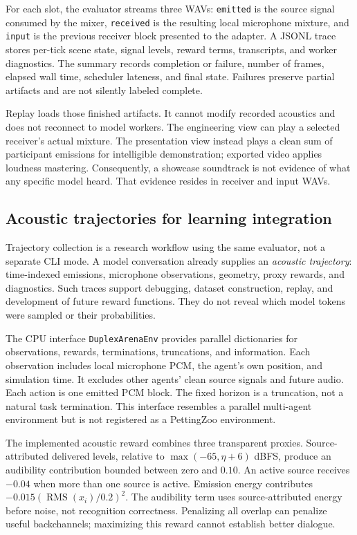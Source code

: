 \documentclass{article}
\newcommand{\code}[1]{\texttt{#1}}
\begin{document}
For each slot, the evaluator streams three WAVs: \code{emitted} is the source signal consumed by the mixer, \code{received} is the resulting local microphone mixture, and \code{input} is the previous receiver block presented to the adapter. A JSONL trace stores per-tick scene state, signal levels, reward terms, transcripts, and worker diagnostics. The summary records completion or failure, number of frames, elapsed wall time, scheduler lateness, and final state. Failures preserve partial artifacts and are not silently labeled complete.

Replay loads those finished artifacts. It cannot modify recorded acoustics and does not reconnect to model workers. The engineering view can play a selected receiver's actual mixture. The presentation view instead plays a clean sum of participant emissions for intelligible demonstration; exported video applies loudness mastering. Consequently, a showcase soundtrack is not evidence of what any specific model heard. That evidence resides in receiver and input WAVs.

\subsection{Acoustic trajectories for learning integration}
Trajectory collection is a research workflow using the same evaluator, not a separate CLI mode. A model conversation already supplies an \emph{acoustic trajectory}: time-indexed emissions, microphone observations, geometry, proxy rewards, and diagnostics. Such traces support debugging, dataset construction, replay, and development of future reward functions. They do not reveal which model tokens were sampled or their probabilities.

The CPU interface \code{DuplexArenaEnv} provides parallel dictionaries for observations, rewards, terminations, truncations, and information. Each observation includes local microphone PCM, the agent's own position, and simulation time. It excludes other agents' clean source signals and future audio. Each action is one emitted PCM block. The fixed horizon is a truncation, not a natural task termination. This interface resembles a parallel multi-agent environment but is not registered as a PettingZoo environment.

The implemented acoustic reward combines three transparent proxies. Source-attributed delivered levels, relative to $\max(-65,\eta+6)$ dBFS, produce an audibility contribution bounded between zero and $0.10$. An active source receives $-0.04$ when more than one source is active. Emission energy contributes $-0.015(\operatorname{RMS}(x_i)/0.2)^2$. The audibility term uses source-attributed energy before noise, not recognition correctness. Penalizing all overlap can penalize useful backchannels; maximizing this reward cannot establish better dialogue.
\end{document}

